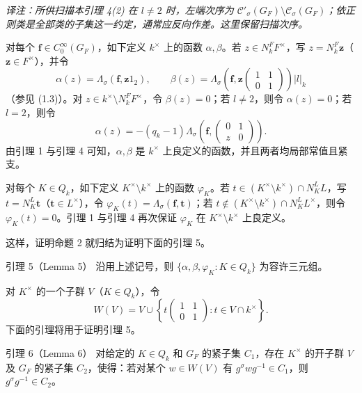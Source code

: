 \noindent\emph{译注：所供扫描本引理 4(2) 在 $l\ne2$ 时，左端次序为 $\mathcal C'_\sigma(G_F)\setminus\mathcal C_\sigma(G_F)$；依正则类是全部类的子集这一约定，通常应反向作差。这里保留扫描次序。}

对每个 $\boldsymbol f\in C_0^\infty(G_F)$，如下定义 $k^\times$ 上的函数 $\alpha,\beta$。若 $z\in N_k^FF^\times$，写 $z=N_k^F\boldsymbol z$（$\boldsymbol z\in F^\times$），并令
\[
 \alpha(z)=\Lambda_\sigma(\boldsymbol f,\boldsymbol z1_2),\qquad
 \beta(z)=\Lambda_\sigma\left(\boldsymbol f,
 \boldsymbol z\begin{pmatrix}1&1\\0&1\end{pmatrix}\right)|l|_k
\]
（参见 (1.3)）。对 $z\in k^\times\setminus N_k^FF^\times$，令 $\beta(z)=0$；若 $l\ne2$，则令 $\alpha(z)=0$；若 $l=2$，则令
\[
 \alpha(z)=-(q_k-1)\Lambda_\sigma\left(\boldsymbol f,
 \begin{pmatrix}0&1\\z&0\end{pmatrix}\right).
\]
由引理 1 与引理 4 可知，$\alpha,\beta$ 是 $k^\times$ 上良定义的函数，并且两者均局部常值且紧支。

对每个 $K\in Q_k$，如下定义 $K^\times\setminus k^\times$ 上的函数 $\varphi_K$。若 $t\in(K^\times\setminus k^\times)\cap N_K^LL$，写 $t=N_K^L\boldsymbol t$（$\boldsymbol t\in L^\times$），令 $\varphi_K(t)=\Lambda_\sigma(\boldsymbol f,\boldsymbol t)$；若 $t\notin(K^\times\setminus k^\times)\cap N_K^LL^\times$，则令 $\varphi_K(t)=0$。引理 1 与引理 4 再次保证 $\varphi_K$ 在 $K^\times\setminus k^\times$ 上良定义。

这样，证明命题 2 就归结为证明下面的引理 5。

\begin{originaltheorem}{引理 5（Lemma 5）}
沿用上述记号，则 $\{\alpha,\beta,\varphi_K:K\in Q_k\}$ 为容许三元组。
\end{originaltheorem}

对 $K^\times$ 的一个子群 $V$（$K\in Q_k$），令
\begin{equation}
 W(V)=V\cup\left\{t\begin{pmatrix}1&1\\0&1\end{pmatrix}:t\in V\cap k^\times\right\}.
 \tag{2.4}
\end{equation}
下面的引理将用于证明引理 5。

\begin{originaltheorem}{引理 6（Lemma 6）}
对给定的 $K\in Q_k$ 和 $G_F$ 的紧子集 $C_1$，存在 $K^\times$ 的开子群 $V$ 及 $G_F$ 的紧子集 $C_2$，使得：若对某个 $w\in W(V)$ 有 $g^\sigma wg^{-1}\in C_1$，则 $g^\sigma g^{-1}\in C_2$。
\end{originaltheorem}

